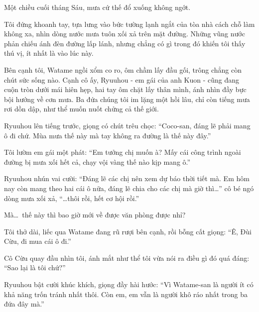 \documentclass[../main.tex]{subfiles}
\begin{document}


Một chiều cuối tháng Sáu, mưa cứ thế đổ xuống không ngớt.


Tôi đứng khoanh tay, tựa lưng vào bức tường lạnh ngắt của tòa nhà cách chỗ làm không xa, nhìn dòng nước mưa tuôn xối xả trên mặt đường. Những vũng nước phản chiếu ánh đèn đường lấp lánh, nhưng chẳng có gì trong đó khiến tôi thấy thú vị, ít nhất là vào lúc này.

Bên cạnh tôi, Watame ngồi xổm co ro, ôm chầm lấy đầu gối, trông chẳng còn chút sức sống nào. Cạnh cô ấy, Ryuuhou - em gái của anh Kuon - cũng đang cuộn tròn dưới mái hiên hẹp, hai tay ôm chặt lấy thân mình, ánh nhìn đầy bực bội hướng về cơn mưa. Ba đứa chúng tôi im lặng một hồi lâu, chỉ còn tiếng mưa rơi dồn dập, như thể muốn nuốt chửng cả thế giới.

Ryuuhou lên tiếng trước, giọng có chút trêu chọc: ``Coco-san, đáng lẽ phải mang ô đi chứ. Mùa mưa thế này mà tay không ra đường là thế này đây.''

Tôi lườm em gái một phát: ``Em tưởng chị muốn à? Mấy cái công trình ngoài đường bị mưa xối hết cả, chạy vội vàng thế nào kịp mang ô.''

Ryuuhou nhún vai cười: ``Đáng lẽ các chị nên xem dự báo thời tiết mà. Em hôm nay còn mang theo hai cái ô nữa, đáng lẽ chia cho các chị mà giờ thì\dots'' cô bé ngó dòng mưa xối xả, ``\dots thôi rồi, hết cơ hội rồi.''

Mà\dots\ thế này thì bao giờ mới về được văn phòng được nhỉ?

Tôi thở dài, liếc qua Watame đang rũ rượi bên cạnh, rồi bỗng cất giọng: ``Ê, Đùi Cừu, đi mua cái ô đi.''

Cô Cừu quay đầu nhìn tôi, ánh mắt như thể tôi vừa nói ra điều gì đó quá đáng: ``Sao lại là tôi chứ?''

Ryuuhou bật cười khúc khích, giọng đầy hài hước: ``Vì Watame-san là người ít có khả năng trốn tránh nhất thôi. Còn em, em vẫn là người khô ráo nhất trong ba đứa đây mà.''
\end{document}
